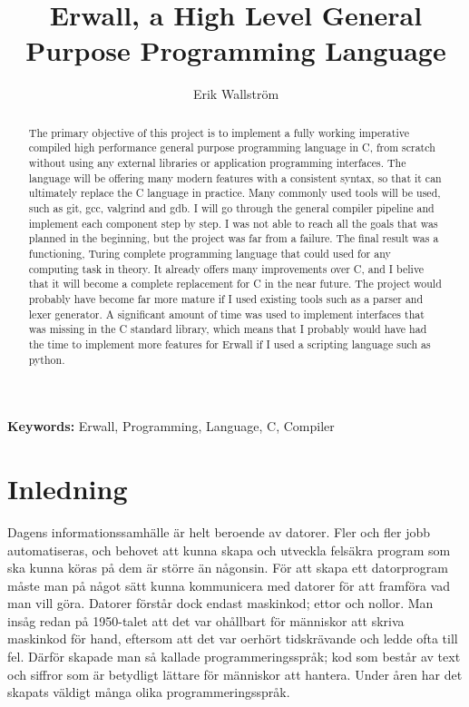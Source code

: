 \documentclass{theme}
\begin{document}
\title{Erwall, a High Level General Purpose Programming Language}
\subtitle{}
\author{Erik Wallström}
\maketitle
\newpage

\begin{abstract}
	The primary objective of this project is to implement a fully working
	imperative compiled high performance general purpose programming language in
	C, from scratch without using any external libraries or application
	programming interfaces. The language will be offering many modern features
	with a consistent syntax, so that it can ultimately replace
	the C language in practice. Many commonly used tools will be used, such as
	git, gcc, valgrind and gdb. I will go through the general compiler pipeline
	and implement each component step by step. I was not able to reach all the
	goals that was planned in the beginning, but the project was far
	from a failure. The final result was a functioning, Turing complete
	programming language that could used for any computing task in theory. It
	already offers many improvements over C, and I belive that it will become a
	complete replacement for C in the near future. The project would probably
	have become far more mature if I used existing tools such as a parser and
	lexer generator. A significant amount of time was used to implement
	interfaces that was missing in the C standard library, which means that I
	probably would have had the time to implement more features for Erwall if
	I used a scripting language such as python.
\end{abstract}

\begin{flushleft}
	{\small {\bf Keywords:} Erwall, Programming, Language, C, Compiler}
\end{flushleft}

\tableofcontents
{}
\newpage
{}

\section{Inledning}

\normalsize

Dagens informationssamhälle är helt beroende av datorer. Fler och fler
jobb automatiseras, och behovet att kunna skapa och utveckla felsäkra program
som ska kunna köras på dem är större än någonsin. För att skapa ett
datorprogram måste man på något sätt kunna kommunicera med datorer för att
framföra vad man vill göra. Datorer förstår dock endast maskinkod; ettor och
nollor. Man insåg redan på 1950-talet att det var ohållbart för människor att
skriva maskinkod för hand, eftersom att det var oerhört tidskrävande och ledde
ofta till fel. Därför skapade man så kallade programmeringsspråk; kod som
består av text och siffror som är betydligt lättare för människor att hantera.
Under åren har det skapats väldigt många olika programmeringsspråk.
\end{document}
